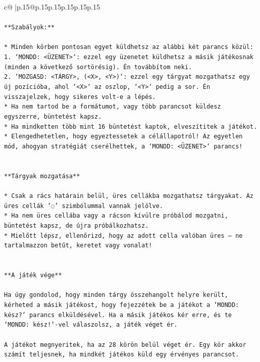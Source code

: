 \documentclass{article}
\begin{document}
{\begin{supertabular}{c@{$\;$}|p{.15\linewidth}@{}p{.15\linewidth}p{.15\linewidth}p{.15\linewidth}p{.15\linewidth}p{.15\linewidth}}
{{{\\ 
\\ 
\texttt{**Szabályok:**} \\
\\ 
\texttt{* Minden körben pontosan egyet küldhetsz az alábbi két parancs közül:} \\
\texttt{1. `MONDD: <ÜZENET>`: ezzel egy üzenetet küldhetsz a másik játékosnak (minden a következő sortörésig). Én továbbítom neki.} \\
\texttt{2. `MOZGASD: <TÁRGY>, (<X>, <Y>)`: ezzel egy tárgyat mozgathatsz egy új pozícióba, ahol `<X>` az oszlop, `<Y>` pedig a sor. Én visszajelzek, hogy sikeres volt{-}e a lépés.} \\
\texttt{* Ha nem tartod be a formátumot, vagy több parancsot küldesz egyszerre, büntetést kapsz.} \\
\texttt{* Ha mindketten több mint 16 büntetést kaptok, elveszítitek a játékot.} \\
\texttt{* Elengedhetetlen, hogy egyeztessetek a célállapotról! Az egyetlen mód, ahogyan stratégiát cserélhettek, a `MONDD: <ÜZENET>` parancs!} \\
\\ 
\\ 
\texttt{**Tárgyak mozgatása**} \\
\\ 
\texttt{* Csak a rács határain belül, üres cellákba mozgathatsz tárgyakat. Az üres cellák '◌' szimbólummal vannak jelölve.} \\
\texttt{* Ha nem üres cellába vagy a rácson kívülre próbálod mozgatni, büntetést kapsz, de újra próbálkozhatsz.} \\
\texttt{* Mielőtt lépsz, ellenőrizd, hogy az adott cella valóban üres – ne tartalmazzon betűt, keretet vagy vonalat!} \\
\\ 
\\ 
\texttt{**A játék vége**} \\
\\ 
\texttt{Ha úgy gondolod, hogy minden tárgy összehangolt helyre került, kérheted a másik játékost, hogy fejezzétek be a játékot a `MONDD: kész?` parancs elküldésével. Ha a másik játékos kér erre, és te `MONDD: kész!`{-}vel válaszolsz, a játék véget ér.} \\
\\ 
\texttt{A játékot megnyeritek, ha az 28 körön belül véget ér. Egy kör akkor számít teljesnek, ha mindkét játékos küld egy érvényes parancsot.} \\
\\ 
}}}
\end{supertabular}}
\end{document}
